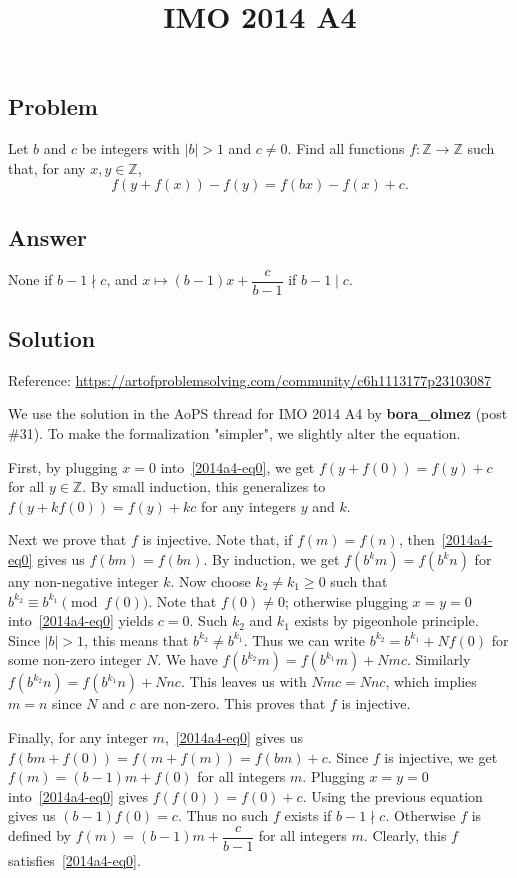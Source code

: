 \documentclass{article}
\title{IMO 2014 A4}
\author{}
\date{}
\newcommand{\Z}{\mathbb{Z}}
\begin{document}
\maketitle



\subsection*{Problem}

Let $b$ and $c$ be integers with $|b| > 1$ and $c \neq 0$.
Find all functions $f : \Z \to \Z$ such that, for any $x, y \in \Z$,
\[ f(y + f(x)) - f(y) = f(bx) - f(x) + c. \tag{*}\label{2014a4-eq0} \]



\subsection*{Answer}

None if $b - 1 \nmid c$, and $x \mapsto (b - 1)x + \dfrac{c}{b - 1}$ if $b - 1 \mid c$.



\subsection*{Solution}

Reference: \url{https://artofproblemsolving.com/community/c6h1113177p23103087}

We use the solution in the AoPS thread for IMO 2014 A4 by \textbf{bora\_olmez} (post \#31).
To make the formalization "simpler", we slightly alter the equation.

First, by plugging $x = 0$ into~\eqref{2014a4-eq0}, we get $f(y + f(0)) = f(y) + c$ for all $y \in \Z$.
By small induction, this generalizes to $f(y + k f(0)) = f(y) + kc$ for any integers $y$ and $k$.

Next we prove that $f$ is injective.
Note that, if $f(m) = f(n)$, then~\eqref{2014a4-eq0} gives us $f(bm) = f(bn)$.
By induction, we get $f(b^k m) = f(b^k n)$ for any non-negative integer $k$.
Now choose $k_2 \neq k_1 \geq 0$ such that $b^{k_2} \equiv b^{k_1} \pmod{f(0)}$.
Note that $f(0) \neq 0$; otherwise plugging $x = y = 0$ into~\eqref{2014a4-eq0} yields $c = 0$.
Such $k_2$ and $k_1$ exists by pigeonhole principle.
Since $|b| > 1$, this means that $b^{k_2} \neq b^{k_1}$.
Thus we can write $b^{k_2} = b^{k_1} + N f(0)$ for some non-zero integer $N$.
We have $f(b^{k_2} m) = f(b^{k_1} m) + Nm c$.
Similarly $f(b^{k_2} n) = f(b^{k_1} n) + Nn c$.
This leaves us with $Nm c = Nn c$, which implies $m = n$ since $N$ and $c$ are non-zero.
This proves that $f$ is injective.

Finally, for any integer $m$,~\eqref{2014a4-eq0} gives us $f(bm + f(0)) = f(m + f(m)) = f(bm) + c$.
Since $f$ is injective, we get $f(m) = (b - 1)m + f(0)$ for all integers $m$.
Plugging $x = y = 0$ into~\eqref{2014a4-eq0} gives $f(f(0)) = f(0) + c$.
Using the previous equation gives us $(b - 1) f(0) = c$.
Thus no such $f$ exists if $b - 1 \nmid c$.
Otherwise $f$ is defined by $f(m) = (b - 1)m + \dfrac{c}{b - 1}$ for all integers $m$.
Clearly, this $f$ satisfies~\eqref{2014a4-eq0}.
\end{document}
